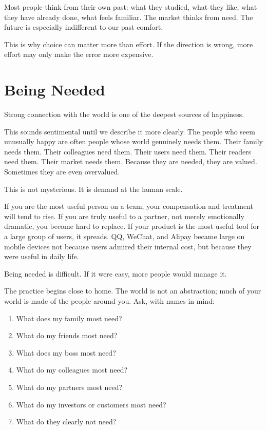 Most people think from their own past: what they studied, what they like, what they have already done, what feels familiar. The market thinks from need. The future is especially indifferent to our past comfort.

This is why choice can matter more than effort. If the direction is wrong, more effort may only make the error more expensive.

\section*{Being Needed}

Strong connection with the world is one of the deepest sources of happiness.

This sounds sentimental until we describe it more clearly. The people who seem unusually happy are often people whose world genuinely needs them. Their family needs them. Their colleagues need them. Their users need them. Their readers need them. Their market needs them. Because they are needed, they are valued. Sometimes they are even overvalued.

This is not mysterious. It is demand at the human scale.

If you are the most useful person on a team, your compensation and treatment will tend to rise. If you are truly useful to a partner, not merely emotionally dramatic, you become hard to replace. If your product is the most useful tool for a large group of users, it spreads. QQ, WeChat, and Alipay became large on mobile devices not because users admired their internal cost, but because they were useful in daily life.

Being needed is difficult. If it were easy, more people would manage it.

The practice begins close to home. The world is not an abstraction; much of your world is made of the people around you. Ask, with names in mind:

\begin{enumerate}
\item What does my family most need?
\item What do my friends most need?
\item What does my boss most need?
\item What do my colleagues most need?
\item What do my partners most need?
\item What do my investors or customers most need?
\item What do they clearly not need?
\end{enumerate}

